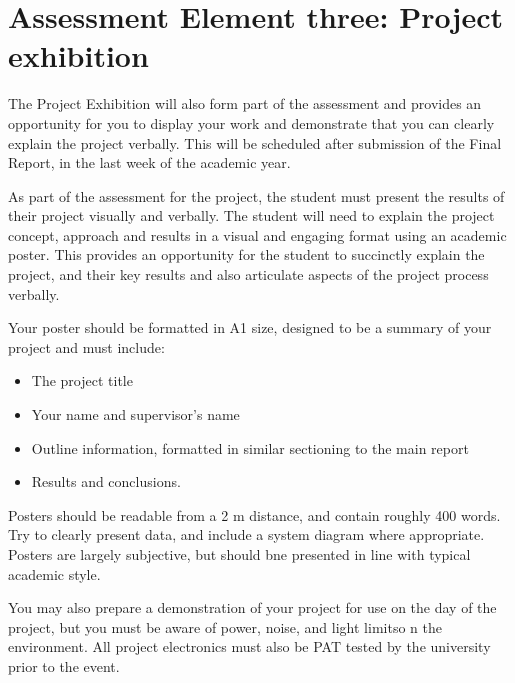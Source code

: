 \section{Assessment Element three: Project exhibition}

The Project Exhibition will also form part of the assessment and provides an opportunity for you to display your work and demonstrate that you can clearly explain the project verbally. This will be scheduled after submission of the Final Report, in the last week of the academic year.

As part of the assessment for the project, the student must present the results of their project visually and verbally. The student will need to explain the project concept, approach and results in a visual and engaging format using an academic poster. This provides an opportunity for the student to succinctly explain the project, and their key results and also articulate aspects of the project process verbally.

Your poster should be formatted in A1 size, designed to be a summary of your project and must include:

\begin{itemize}
    \item The project title
    \item Your name and supervisor's name
    \item Outline information, formatted in similar sectioning to the main report
    \item Results and conclusions.
\end{itemize}

Posters should be readable from a 2 m distance, and contain roughly 400 words. Try to clearly present data, and include a system diagram where appropriate. Posters are largely subjective, but should bne presented in line with typical academic style.

You may also prepare a demonstration of your project for use on the day of the project, but you must be aware of power, noise, and light limitso n the environment. All project electronics must also be PAT tested by the university prior to the event.
